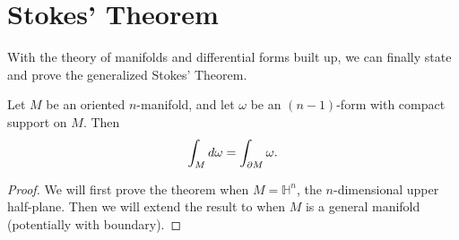 \documentclass[twoside,10pt]{article}
\begin{document}
\section{Stokes' Theorem}

With the theory of manifolds and differential forms built up, we can finally state and prove the generalized Stokes' Theorem.

\begin{thrm}
	Let $M$ be an oriented $n$-manifold, and let $\omega$ be an $(n-1)$-form with compact support on $M$. Then
	\[
	\int_{M} d\omega = \int_{\partial M}\omega.
	\] 
\end{thrm}
\begin{proof}
	We will first prove the theorem when $M = \mathbb{H}^{n}$, the $n$-dimensional upper half-plane. Then we will extend the result to when $M$ is a general manifold (potentially with boundary).


\end{proof}
\end{document}
